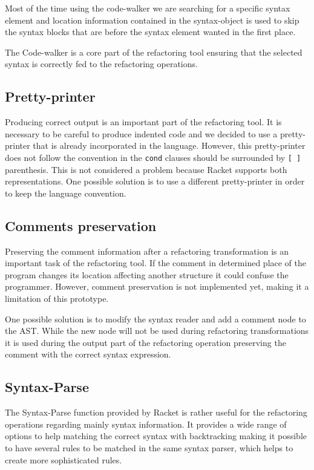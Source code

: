 Most of the time using the code-walker we are searching for a specific syntax element
and location information contained in the syntax-object  is used to skip the syntax
 blocks that are before the syntax element wanted in the first place.

The Code-walker is a core part of the refactoring tool ensuring that the selected
syntax is correctly fed to the refactoring operations. %


\subsection{Pretty-printer} %
Producing correct output is an important part of the refactoring tool.
It is necessary to be careful to produce indented code and we decided to use a pretty-printer
that is already incorporated in the language.
However, this pretty-printer does not follow the convention in the {\tt cond} clauses
should be surrounded by {\tt [ ] } parenthesis. This is not considered a problem because
Racket supports both representations.
One possible solution is to use a different pretty-printer in
order to keep the language convention.


\subsection{Comments preservation}
Preserving the comment information after a refactoring transformation is an important task
of the refactoring tool. If the comment in determined place of the program
changes its location affecting another structure it could confuse the programmer.
However, comment preservation is not implemented yet, making it a limitation of
this prototype.

One possible solution is to modify the syntax reader and add a comment node to the
AST.
While the new node will not be used during refactoring transformations it is used
during the output part of the refactoring operation preserving the comment with
the correct syntax expression.


\subsection{Syntax-Parse}

The Syntax-Parse function provided by Racket is rather useful for the refactoring
operations regarding mainly syntax information.
It provides a wide range of options to help matching the correct syntax with  %
backtracking making it possible to have several rules to be matched
in the same syntax parser, which helps to create more sophisticated rules.


